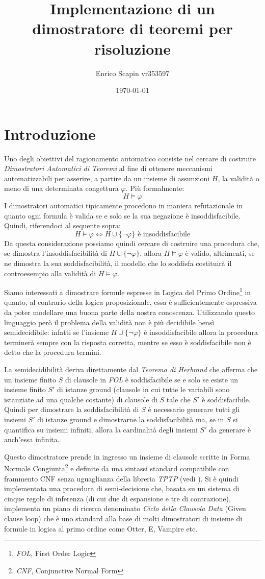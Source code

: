 \documentclass[a4paper,11pt]{article}
\title{\bf{Implementazione di un dimostratore di teoremi per risoluzione}}
\author{Enrico Scapin vr353597}
\date{\today}
\begin{document}
\maketitle

\small
\section{Introduzione}
Uno degli obiettivi del ragionamento automatico consiste nel cercare di costruire \emph{Dimostratori Automatici di Teoremi} al fine di ottenere meccanismi automatizzabili per asserire, a partire da un insieme di assunzioni $H$, la validità o meno di una determinata congettura $\varphi$. Più formalmente:
\[ H \models \varphi \]
I dimostratori automatici tipicamente procedono in maniera refutazionale in quanto ogni formula è valida se e solo se la sua negazione è insoddisfacibile. Quindi, riferendoci al sequente sopra:
\[ H \models \varphi \Longleftrightarrow H \cup \lbrace\neg \varphi\rbrace \text{ è insoddisfacibile} \]
Da questa considerazione possiamo quindi cercare di costruire una procedura che, se dimostra l'insoddisfacibilità di $H \cup \lbrace\neg \varphi\rbrace$, allora $ H \models \varphi $ è valido, altrimenti, se ne dimostra la sua soddisfacibilità, il modello che lo soddisfa costituirà il controesempio alla validità di $ H \models \varphi $.\par
Siamo interessati a dimostrare formule espresse in Logica del Primo Ordine\footnote{\emph{FOL}, First Order Logic} in quanto, al contrario della logica proposizionale, essa è sufficientemente espressiva da poter modellare una buona parte della nostra conoscenza. Utilizzando questo linguaggio però il problema della validità non è più decidibile bensì semidecidibile: infatti se l'insieme $H \cup \lbrace\neg \varphi\rbrace $ è insoddisfacibile allora la procedura terminerà sempre con la risposta corretta, mentre se esso è soddisfacibile non è detto che la procedura termini. \par
La semidecidibilità deriva direttamente dal \emph{Teorema di Herbrand} che afferma che un insieme finito $S$ di clausole in \emph{FOL} è soddisfacibile se e solo se esiste un insieme finito $S'$ di istanze ground (clausole in cui tutte le variabili sono istanziate ad una qualche costante) di clausole di $S$ tale che $S'$ è soddisfacibile. Quindi per dimostrare la soddisfacibilità di $S$ è necessario generare tutti gli insiemi $S'$ di istanze ground e dimostrarne la soddisfacibilità ma, se in $S$ si quantifica su insiemi infiniti, allora la cardinalità degli insiemi $S'$ da generare è anch'essa infinita.\par
Questo dimostratore prende in ingresso un insieme di clausole scritte in Forma Normale Congiunta\footnote{\emph{CNF}, Conjunctive Normal Form} e definite da una sintassi standard compatibile con frammento CNF senza uguaglianza della libreria \emph{TPTP} (vedi \cite{TPTP}). Si è quindi implementata una procedura di semi-decisione che, basata su un sistema di cinque regole di inferenza (di cui due di espansione e tre di contrazione), implementa un piano di ricerca denominato \emph{Ciclo della Clausola Data} (Given clause loop) che è uno standard alla base di molti dimostratori di insieme di formule in logica al primo ordine come Otter, E, Vampire etc.
\end{document}

